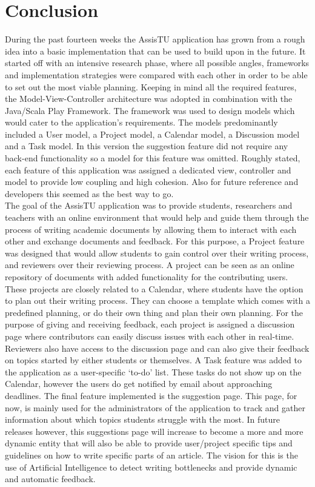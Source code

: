 \chapter{Conclusion}

During the past fourteen weeks the AssisTU application has grown from a rough idea into a basic implementation that can be used to build upon in the future. It started off with an intensive research phase, where all possible angles, frameworks and implementation strategies were compared with each other in order to be able to set out the most viable planning. Keeping in mind all the required features, the Model-View-Controller architecture was adopted in combination with the Java/Scala Play Framework.
The framework was used to design models which would cater to the application's requirements. The models predominantly included a User model, a Project model, a Calendar model, a Discussion model and a Task model. In this version the suggestion feature did not require any back-end functionality so a model for this feature was omitted. Roughly stated, each feature of this application was assigned a dedicated view, controller and model to provide low coupling and high cohesion. Also for future reference and developers this seemed as the best way to go. \\

The goal of the AssisTU application was to provide students, researchers and teachers with an online environment that would help and guide them through the process of writing academic documents by allowing them to interact with each other and exchange documents and feedback. For this purpose, a Project feature was designed that would allow students to gain control over their writing process, and reviewers over their reviewing process. A project can be seen as an online repository of documents with added functionality for the contributing users. These projects are closely related to a Calendar, where students have the option to plan out their writing process. They can choose a template which comes with a predefined planning, or do their own thing and plan their own planning. For the purpose of giving and receiving feedback, each project is assigned a discussion page where contributors can easily discuss issues with each other in real-time. Reviewers also have access to the discussion page and can also give their feedback on topics started by either students or themselves. A Task feature was added to the application as a user-specific `to-do' list. These tasks do not show up on the Calendar, however the users do get notified by email about approaching deadlines. The final feature implemented is the suggestion page. This page, for now, is mainly used for the administrators of the application to track and gather information about which topics students struggle with the most. In 
future releases however, this suggestions page will increase to become a more and more dynamic entity that will also be able to provide user/project specific tips and guidelines on how to write specific parts of an article. The vision for this is the use of Artificial Intelligence to detect writing bottlenecks and provide dynamic and automatic feedback. \\

